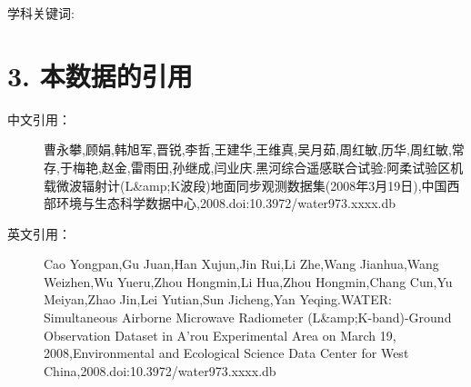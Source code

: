 \documentclass[letterpaper,10pt,english]{sphinxmanual}
\begin{document}
学科关键词:


\section{3. 本数据的引用}
\label{fecd46b0-3390-4580-a415-2d49ba77f9bd:id3}\begin{description}
\item[{中文引用：}] \leavevmode
曹永攀,顾娟,韩旭军,晋锐,李哲,王建华,王维真,吴月茹,周红敏,历华,周红敏,常存,于梅艳,赵金,雷雨田,孙继成,闫业庆.黑河综合遥感联合试验:阿柔试验区机载微波辐射计(L\&amp;K波段)地面同步观测数据集(2008年3月19日),中国西部环境与生态科学数据中心,2008.doi:10.3972/water973.xxxx.db

\item[{英文引用：}] \leavevmode
Cao Yongpan,Gu Juan,Han Xujun,Jin Rui,Li Zhe,Wang Jianhua,Wang Weizhen,Wu Yueru,Zhou Hongmin,Li Hua,Zhou Hongmin,Chang Cun,Yu Meiyan,Zhao Jin,Lei Yutian,Sun Jicheng,Yan Yeqing.WATER: Simultaneous Airborne Microwave Radiometer (L\&amp;K-band)-Ground Observation Dataset in A'rou Experimental Area on March 19, 2008,Environmental and Ecological Science Data Center for West China,2008.doi:10.3972/water973.xxxx.db

\end{description}
\end{document}
